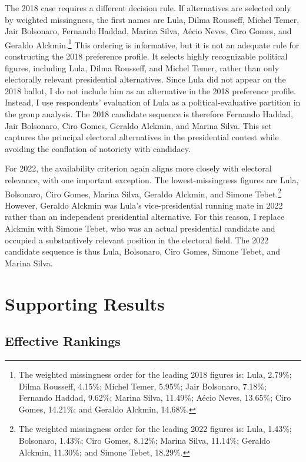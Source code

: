 \documentclass[12pt]{article}
\begin{document}
The 2018 case requires a different decision rule. If alternatives are selected
only by weighted missingness, the first names are Lula, Dilma Rousseff, Michel
Temer, Jair Bolsonaro, Fernando Haddad, Marina Silva, Aécio Neves, Ciro Gomes,
and Geraldo Alckmin.\footnote{The weighted missingness order for the leading
2018 figures is: Lula, 2.79\%; Dilma Rousseff, 4.15\%; Michel Temer, 5.95\%;
Jair Bolsonaro, 7.18\%; Fernando Haddad, 9.62\%; Marina Silva, 11.49\%; Aécio
Neves, 13.65\%; Ciro Gomes, 14.21\%; and Geraldo Alckmin, 14.68\%.} This
ordering is informative, but it is not an adequate rule for constructing the
2018 preference profile. It selects highly recognizable political figures,
including Lula, Dilma Rousseff, and Michel Temer, rather than only electorally
relevant presidential alternatives. Since Lula did not appear on the 2018
ballot, I do not include him as an alternative in the 2018 preference profile.
Instead, I use respondents' evaluation of Lula as a political-evaluative
partition in the group analysis. The 2018 candidate sequence is therefore
Fernando Haddad, Jair Bolsonaro, Ciro Gomes, Geraldo Alckmin, and Marina Silva.
This set captures the principal electoral alternatives in the presidential
contest while avoiding the conflation of notoriety with candidacy.

For 2022, the availability criterion again aligns more closely with electoral
relevance, with one important exception. The lowest-missingness figures are
Lula, Bolsonaro, Ciro Gomes, Marina Silva, Geraldo Alckmin, and Simone
Tebet.\footnote{The weighted missingness order for the leading 2022 figures is:
Lula, 1.43\%; Bolsonaro, 1.43\%; Ciro Gomes, 8.12\%; Marina Silva, 11.14\%;
Geraldo Alckmin, 11.30\%; and Simone Tebet, 18.29\%.} However, Geraldo Alckmin
was Lula's vice-presidential running mate in 2022 rather than an independent
presidential alternative. For this reason, I replace Alckmin with Simone Tebet,
who was an actual presidential candidate and occupied a substantively relevant
position in the electoral field. The 2022 candidate sequence is thus Lula,
Bolsonaro, Ciro Gomes, Simone Tebet, and Marina Silva.



\section{Supporting Results}
\subsection{Effective Rankings}
\end{document}
